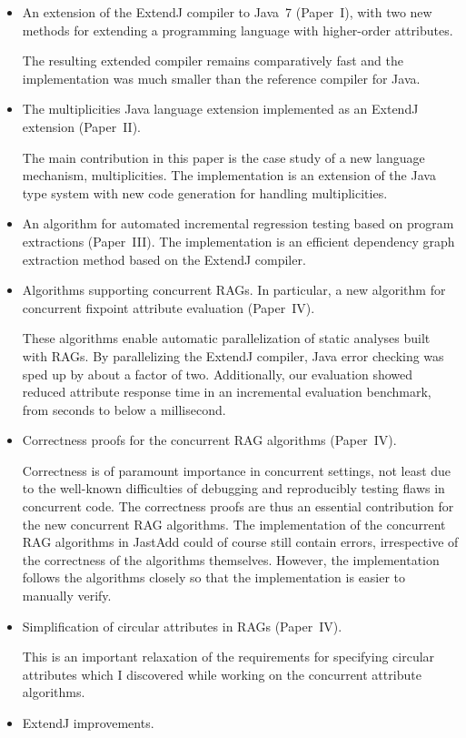 \documentclass[10pt, twoside, openright]{book}
\begin{document}
\begin{itemize}
  \item An extension of the ExtendJ compiler to Java~7 (Paper~I),
    with two new methods for extending a programming language with higher-order
    attributes.

    The resulting extended compiler remains comparatively
    fast and the implementation was much smaller than the reference
    compiler for Java.
  \item The multiplicities Java language extension implemented as an ExtendJ extension (Paper~II).

    The main contribution in this paper is the case study of a new language mechanism,
    multiplicities.  The implementation is an extension of the Java type system
    with new code generation for handling multiplicities.
  \item An algorithm for automated incremental regression testing
    based on program extractions (Paper~III).
      The implementation is an efficient dependency graph extraction method
      based on the ExtendJ compiler.
  \item Algorithms supporting concurrent RAGs. In particular, a new algorithm for concurrent
    fixpoint attribute evaluation (Paper~IV).

    These algorithms enable automatic parallelization of static analyses built with RAGs.
    By parallelizing the ExtendJ compiler, Java error checking was sped up by about a factor of two.
    Additionally, our evaluation showed reduced attribute response time in an incremental
    evaluation benchmark, from seconds to below a millisecond.
  \item Correctness proofs for the concurrent RAG algorithms (Paper~IV).

    Correctness is of paramount importance in concurrent settings, not least due
    to the well-known difficulties of debugging and reproducibly testing flaws in concurrent code.
    The correctness proofs are thus an essential contribution for the new concurrent RAG algorithms.
    The implementation of the concurrent RAG algorithms in JastAdd could of course still contain
    errors, irrespective of the correctness of the algorithms themselves.
    However, the implementation follows the algorithms closely so that the implementation is
    easier to manually verify.
  \item Simplification of circular attributes in RAGs (Paper~IV).

    This is an important relaxation of the requirements for specifying circular attributes
    which I discovered while working on the concurrent attribute algorithms.
  \item ExtendJ improvements.


\end{itemize}
\end{document}
